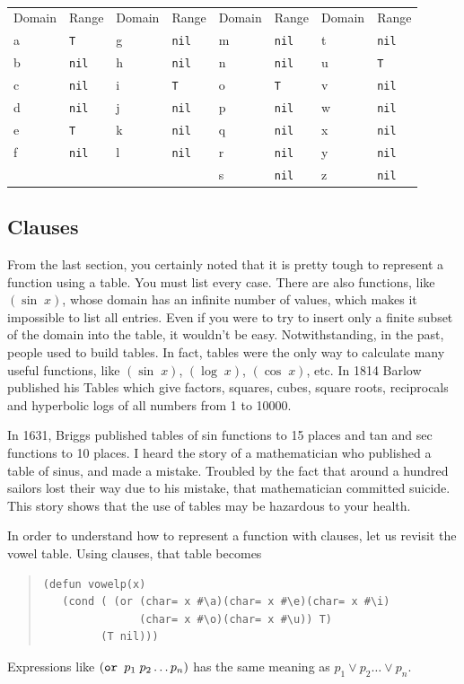 \documentclass[a4paper,12pt]{book}
\begin{document}
\verb||\\
{\footnotesize
\begin{tabular}{|p{1.2cm} p{1.2cm} | p{1.2cm} p{1.2cm} |p{1.2cm} p{1.2cm} | p{1.2cm} p{1.2cm} |}
Domain & Range & Domain & Range & Domain & Range & Domain & Range\\
a & \verb|T| & g &\verb|nil| & m &\verb|nil| & t & \verb|nil| \\
b & \verb|nil| & h &\verb|nil| & n & \verb|nil| & u & \verb|T| \\
c & \verb|nil| &  i &\verb|T| &o &\verb|T| & v & \verb|nil|\\
d &\verb|nil| &  j & \verb|nil| & p & \verb|nil| & w & \verb|nil| \\
e &\verb|T| & k & \verb|nil| & q & \verb|nil| & x & \verb|nil| \\
f &\verb|nil| &  l &\verb|nil| & r & \verb|nil| & y & \verb|nil| \\
&            &                 &  & s & \verb|nil| & z & \verb|nil|\\
\end{tabular}}

\subsection{Clauses}
From the last section, you certainly noted that it is pretty
tough to represent a function using a table. You must list
every case. There are also functions, like $(\sin\;x)$, whose
domain has an infinite number of values, which makes it
impossible to list all entries.  Even if you were to try to
insert only a finite subset of the domain into the table, it
wouldn't be easy.  Notwithstanding, in the past, people used
to build tables. In fact, tables were the only way to calculate
many useful functions, like $(\sin\;x)$,  $(\log\;x)$,
$(\cos\;x)$, etc. In 1814 Barlow published his Tables which
give factors, squares, cubes, square roots, reciprocals
and hyperbolic logs of all numbers from 1 to 10000.

In 1631, Briggs published tables of sin functions to 15 places
and tan and sec functions to 10 places. I heard the story of a mathematician who published a table of sinus, and made a mistake. Troubled by the fact that around a hundred sailors lost their way
due to his mistake, that mathematician committed suicide. This
story shows that the use of tables may be hazardous to your health.

In order to understand how to represent a function with clauses,
let us revisit the vowel table. Using clauses, that table becomes
\begin{quote}\small
\begin{verbatim}
(defun vowelp(x)
   (cond ( (or (char= x #\a)(char= x #\e)(char= x #\i) 
               (char= x #\o)(char= x #\u)) T)
         (T nil)))
\end{verbatim}
\end{quote}
Expressions like $(\verb|or | p_1\;p_2\ldots p_n)$ has the same 
meaning as $p_1 \vee p_2\ldots \vee p_n$.
\end{document}
